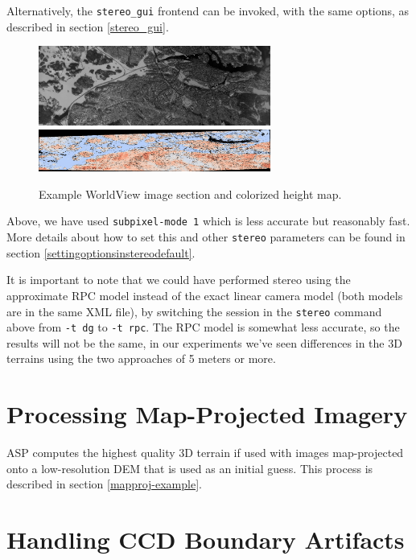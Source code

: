 Alternatively, the \texttt{stereo\_gui} frontend can be invoked, with
the same options, as described in section \ref{stereo_gui}.

\begin{figure}[h!]
\centering
  \includegraphics[width=3.0in]{images/examples/dg/wv_tutorial_input.png}
  \includegraphics[width=3.0in]{images/examples/dg/wv_tutorial_colormap.png}
\caption{Example WorldView image section and colorized height map.}
\label{fig:dg-nomap-example}
\end{figure}

Above, we have used \texttt{subpixel-mode 1} which is less accurate but
reasonably fast.  More details about how to set this and other
\texttt{stereo} parameters can be found in section
\ref{settingoptionsinstereodefault}.

It is important to note that we could have performed stereo using the
approximate RPC model instead of the exact linear camera model (both
models are in the same XML file), by switching the session in the
\texttt{stereo} command above from \texttt{-t dg} to \texttt{-t
rpc}. The RPC model is somewhat less accurate, so the results will not
be the same, in our experiments we've seen differences in the 3D
terrains using the two approaches of 5 meters or more.

\section{Processing Map-Projected Imagery}
\label{mapproj}

ASP computes the highest quality 3D terrain if used with images map-projected
onto a low-resolution DEM that is used as an initial guess. This process
is described in section \ref{mapproj-example}.

\section{Handling CCD Boundary Artifacts}
\label{wvcorrect-example}

